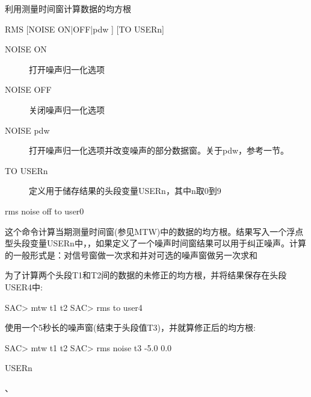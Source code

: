 \label{cmd:rms}

利用测量时间窗计算数据的均方根

\begin{SACSTX}
RMS [NOISE ON|OFF|pdw ] [TO USERn]
\end{SACSTX}

\begin{description}
\item [NOISE ON] 打开噪声归一化选项  
\item [NOISE OFF] 关闭噪声归一化选项  
\item [NOISE pdw] 打开噪声归一化选项并改变噪声的部分数据窗。关于pdw，参考一节。
\item [TO USERn] 定义用于储存结果的头段变量USERn，其中n取0到9 
\end{description}

\begin{SACDFT}
rms noise off to user0
\end{SACDFT}

这个命令计算当期测量时间窗(参见MTW)中的数据的均方根。结果写入一个浮点型头段变量USERn中，，如果定义了一个噪声时间窗结果可以用于纠正噪声。计算的一般形式是：对信号窗做一次求和并对可选的噪声窗做另一次求和

为了计算两个头段T1和T2间的数据的未修正的均方根，并将结果保存在头段USER4中:
\begin{SACCode}
SAC> mtw t1 t2
SAC> rms to user4
\end{SACCode}

使用一个5秒长的噪声窗(结束于头段值T3)，并就算修正后的均方根:
\begin{SACCode}
SAC> mtw t1 t2
SAC> rms noise t3 -5.0 0.0
\end{SACCode}

USERn

、
